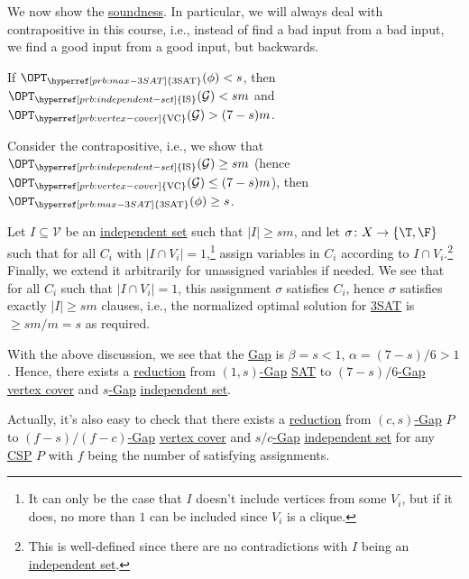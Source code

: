 We now show the \hyperref[def:soundness]{soundness}. In particular, we will always deal with contrapositive in this course, i.e., instead of find a bad input from a bad input, we find a good input from a good input, but backwards.

\begin{claim}
	If	\(\OPT_{\hyperref[prb:max-3SAT]{\text{3SAT}}} (\phi) < s\), then \(\OPT_{\hyperref[prb:independent-set]{\text{IS}} }(\mathcal{G} ) < sm\) and \(\OPT_{\hyperref[prb:vertex-cover]{\text{VC}} }(\mathcal{G} ) > (7-s)m\).
\end{claim}
\begin{explanation}
	Consider the contrapositive, i.e., we show that \(\OPT_{\hyperref[prb:independent-set]{\text{IS}} }(\mathcal{G} ) \geq sm\) (hence \(\OPT_{\hyperref[prb:vertex-cover]{\text{VC}} }(\mathcal{G} ) \leq (7-s)m\)), then \(\OPT_{\hyperref[prb:max-3SAT]{\text{3SAT}} }(\phi) \geq s\).

	Let \(I \subseteq \mathcal{V} \) be an \hyperref[def:independent-set]{independent set} such that \(\vert I \vert \geq sm\), and let \(\sigma \colon X \to \left\{ \T, \F \right\} \) such that for all \(C_i\) with \(\vert I \cap V_i \vert = 1\),\footnote{It can only be the case that \(I\) doesn't include vertices from some \(V_i\), but if it does, no more than \(1\) can be included since \(V_i\) is a clique.} assign variables in \(C_i\) according to \(I \cap V_i\).\footnote{This is well-defined since there are no contradictions with \(I\) being an \hyperref[def:independent-set]{independent set}.} Finally, we extend it arbitrarily for unassigned variables if needed. We see that for all \(C_i\) such that \(\vert I \cap  V_i \vert = 1\), this assignment \(\sigma \) satisfies \(C_i\), hence \(\sigma \) satisfies exactly \(\vert I \vert \geq sm\) clauses, i.e., the normalized optimal solution for \hyperref[prb:max-3SAT]{3SAT} is \(\geq sm/m = s\) as required.
\end{explanation}

With the above discussion, we see that the \hyperref[def:Gap]{Gap} is \(\beta = s < 1\), \(\alpha = (7-s) / 6 > 1\). Hence, there exists a \hyperref[def:reduction]{reduction} from \hyperref[def:c-s-Gap]{\((1, s)\)-Gap} \hyperref[prb:max-3SAT]{SAT} to \hyperref[def:Gap]{\((7 - s) / 6\)-Gap} \hyperref[prb:vertex-cover]{vertex cover} and \hyperref[def:Gap]{\(s\)-Gap} \hyperref[prb:independent-set]{independent set}.

\begin{remark}
	Actually, it's also easy to check that there exists a \hyperref[def:reduction]{reduction} from \hyperref[def:c-s-Gap]{\((c, s)\)-Gap} \(P\) to \hyperref[def:Gap]{\((f-s) / (f-c)\)-Gap} \hyperref[prb:vertex-cover]{vertex cover} and \hyperref[def:Gap]{\(s / c\)-Gap} \hyperref[def:independent-set]{independent set} for any \hyperref[prb:CSP]{CSP} \(P\) with \(f\) being the number of satisfying assignments.
\end{remark}

